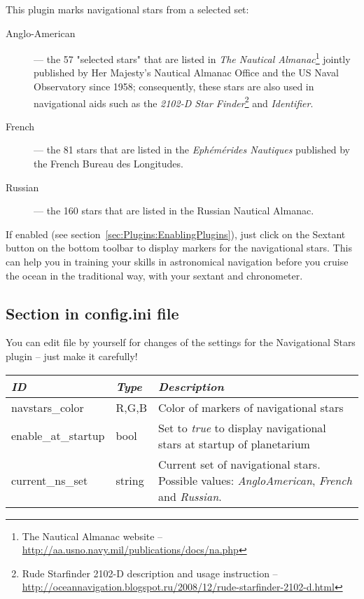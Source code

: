\noindent This plugin marks navigational stars from a selected set:
\begin{description}
	\item[Anglo-American] --- the 57 "selected stars" that are listed in \emph{The Nautical Almanac}\footnote{The Nautical Almanac
		website -- \url{http://aa.usno.navy.mil/publications/docs/na.php}} jointly published by Her Majesty's Nautical Almanac Office and the US Naval Observatory since 1958; consequently, these stars are also used in navigational aids such as the \emph{2102-D Star Finder}\footnote{Rude Starfinder 2102-D
		description and usage instruction --
		\url{http://oceannavigation.blogspot.ru/2008/12/rude-starfinder-2102-d.html}} and \emph{Identifier}. 
	\item[French] --- the 81 stars that are listed in the \emph{Ephémérides Nautiques} published by the French Bureau des Longitudes.
	\item[Russian] --- the 160 stars that are listed in the Russian Nautical Almanac.
\end{description}
If enabled (see section~\ref{sec:Plugins:EnablingPlugins}), just click
on the Sextant button  on
the bottom toolbar to display markers for the navigational stars. This
can help you in training your skills in astronomical navigation before
you cruise the ocean in the traditional way, with your sextant and
chronometer.


\subsection{Section  in config.ini file}

You can edit  file by yourself for changes of the
settings for the Navigational Stars plugin -- just make it carefully!

\noindent%
\begin{tabularx}{\textwidth}{l|l|X}\toprule
\emph{ID}			& \emph{Type} 	& \emph{Description}\\\midrule
navstars\_color 	& R,G,B 		& Color of markers of navigational stars  \\
enable\_at\_startup & bool 		    & Set to \emph{true} to display navigational stars at startup of planetarium  \\
current\_ns\_set	& string		& Current set of navigational stars. Possible values: \emph{AngloAmerican}, \emph{French} and \emph{Russian}. \\
\bottomrule
\end{tabularx}


